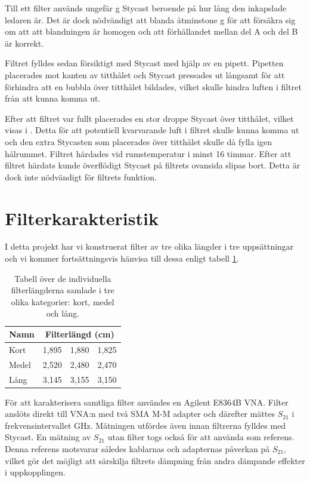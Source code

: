 \documentclass[main.tex]{subfiles}
\begin{document}
Till ett filter används ungefär \unit[2]{g} Stycast beroende på hur lång den inkapslade ledaren är. Det är dock nödvändigt att blanda åtminstone \unit[10]{g} för att försäkra sig om att att blandningen är homogen och att förhållandet mellan del A och del B är korrekt. 

Filtret fylldes sedan försiktigt med Stycast med hjälp av en pipett. Pipetten placerades mot kanten av titthålet och Stycast pressades ut långsamt för att förhindra att en bubbla över titthålet bildades, vilket skulle hindra luften i filtret från att kunna komma ut. 

Efter att filtret var fullt placerades en stor droppe Stycast över titthålet, vilket visas i . Detta för att potentiell kvarvarande luft i filtret skulle kunna komma ut och den extra Stycasten som placerades över titthålet skulle då fylla igen hålrummet. Filtret härdades vid rumstemperatur i minst 16 timmar. Efter att filtret härdats kunde överflödigt Stycast på filtrets ovansida slipas bort. Detta är dock inte nödvändigt för filtrets funktion.


\section{Filterkarakteristik}
\label{sec:filter_kar}
I detta projekt har vi konstruerat filter av tre olika längder i tre uppsättningar och vi kommer fortsättningsvis hänvisa till dessa enligt tabell \ref{tab:filter_list}.

\begin{table}[h]
    \centering
    \caption{Tabell över de individuella filterlängderna samlade i tre olika kategorier: kort, medel och lång.}
    \label{tab:filter_list}
    \begin{tabular}{llll}\toprule
        Namn & \multicolumn{3}{c}{Filterlängd (\unit{cm})} \\
        \midrule
        Kort & 1,895 & 1,880 & 1,825 \\
        Medel & 2,520 & 2,480 & 2,470 \\
        Lång & 3,145 & 3,155 & 3,150\\
        \bottomrule
    \end{tabular}
\end{table}

För att karakterisera samtliga filter användes en Agilent E8364B VNA. Filter anslöts direkt till VNA:n med två SMA M-M adapter och därefter mättes $S_{21}$ i frekvensintervallet \unit[1-50]{GHz}. Mätningen utfördes även innan filtrerna fylldes med Stycast. En mätning av $S_{21}$ utan filter togs också för att använda som referens. Denna referens motsvarar således kablarnas och adapternas påverkan på $S_{21}$, vilket gör det möjligt att särskilja filtrets dämpning från andra dämpande effekter i uppkopplingen.%
\end{document}
